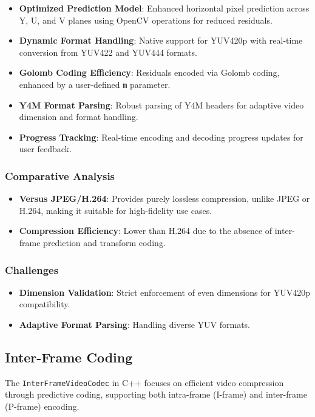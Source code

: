 \documentclass[a4paper,14pt]{article}
\begin{document}
\begin{itemize}
\item \textbf{Optimized Prediction Model}: Enhanced horizontal pixel prediction across Y, U, and V planes using OpenCV operations for reduced residuals.
\item \textbf{Dynamic Format Handling}: Native support for YUV420p with real-time conversion from YUV422 and YUV444 formats.
\item \textbf{Golomb Coding Efficiency}: Residuals encoded via Golomb coding, enhanced by a user-defined \texttt{m} parameter.
\item \textbf{Y4M Format Parsing}: Robust parsing of Y4M headers for adaptive video dimension and format handling.
\item \textbf{Progress Tracking}: Real-time encoding and decoding progress updates for user feedback.
\end{itemize}

\subsubsection{Comparative Analysis}
\begin{itemize}
\item \textbf{Versus JPEG/H.264}: Provides purely lossless compression, unlike JPEG or H.264, making it suitable for high-fidelity use cases.
\item \textbf{Compression Efficiency}: Lower than H.264 due to the absence of inter-frame prediction and transform coding.
\end{itemize}

\subsubsection{Challenges}
\begin{itemize}
\item \textbf{Dimension Validation}: Strict enforcement of even dimensions for YUV420p compatibility.
\item \textbf{Adaptive Format Parsing}: Handling diverse YUV formats.
\end{itemize}

\subsection{Inter-Frame Coding}
The \texttt{InterFrameVideoCodec} in C++ focuses on efficient video compression through predictive coding, supporting both intra-frame (I-frame) and inter-frame (P-frame) encoding.
\end{document}
